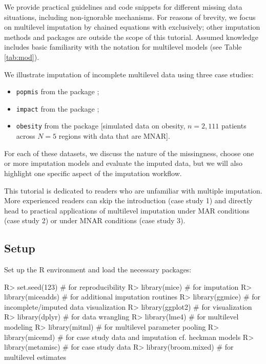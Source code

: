 \documentclass[
]{jss}
\providecommand{\tightlist}{%
  \setlength{\itemsep}{0pt}\setlength{\parskip}{0pt}}
\begin{document}
We provide practical guidelines and code snippets for different missing
data situations, including non-ignorable mechanisms. For reasons of
brevity, we focus on multilevel imputation by chained equations with
 exclusively; other imputation methods and packages \citep[see
e.g.][ and \citet{grun18}]{audi18} are outside the scope of this
tutorial. Assumed knowledge includes basic familiarity with the
 notation for multilevel models (see Table \ref{tab:mod}).

We illustrate imputation of incomplete multilevel data using three case
studies:

\begin{itemize}
\tightlist
\item
  \texttt{popmis} from the  package \citep[simulated data on
  perceived popularity, \(n = 2,000\) pupils across \(N = 100\) schools
  with data that are MAR,][]{mice};
\item
  \texttt{impact} from the  package \citep[empirical data
  on traumatic brain injuries, \(n = 11,022\) patients across \(N = 15\)
  studies with data that are MAR,][]{metamisc};
\item
  \texttt{obesity} from the  package {[}simulated data on
  obesity, \(n = 2,111\) patients across \(N = 5\) regions with data
  that are MNAR{]}.
\end{itemize}

For each of these datasets, we discuss the nature of the missingness,
choose one or more imputation models and evaluate the imputed data, but
we will also highlight one specific aspect of the imputation workflow.

This tutorial is dedicated to readers who are unfamiliar with multiple
imputation. More experienced readers can skip the introduction (case
study 1) and directly head to practical applications of multilevel
imputation under MAR conditions (case study 2) or under MNAR conditions
(case study 3).

\hypertarget{setup}{%
\subsection{Setup}\label{setup}}

Set up the R environment and load the necessary packages:

\begin{CodeChunk}
\begin{CodeInput}
R> set.seed(123)         # for reproducibility
R> library(mice)         # for imputation
R> library(miceadds)     # for additional imputation routines
R> library(ggmice)       # for incomplete/imputed data visualization
R> library(ggplot2)      # for visualization
R> library(dplyr)        # for data wrangling
R> library(lme4)         # for multilevel modeling
R> library(mitml)        # for multilevel parameter pooling
R> library(micemd)       # for case study data and imputation cf. heckman models
R> library(metamisc)     # for case study data
R> library(broom.mixed)  # for multilevel estimates
\end{CodeInput}
\end{CodeChunk}
\end{document}
